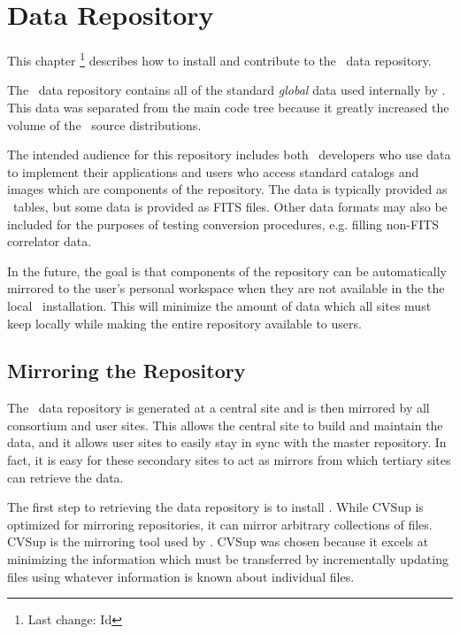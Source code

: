 \chapter{Data Repository}
\label{data repository}

This chapter \footnote{Last change:
$ $Id$ $}
describes how to install and contribute to the \aipspp\ data repository.

The \aipspp\ data repository contains all of the standard \textit{global}
data used internally by \aipspp. This data was separated from the main code tree
because it greatly increased the volume of the \aipspp\ source distributions.

The intended audience for this repository includes both \aipspp\ developers
who use data to implement their applications and users who access standard
catalogs and images which are components of the repository. The data is
typically provided as \aipspp\ tables, but some data is provided as FITS
files. Other data formats may also be included for the purposes of testing
conversion procedures, e.g. filling non-FITS correlator data.

In the future, the goal is that components of the repository can be
automatically mirrored to the user's personal workspace when they are not
available in the the local \aipspp\ installation. This will minimize the
amount of data which all sites must keep locally while making the entire
repository available to users.


\section{Mirroring the Repository}
\label{data repository mirroring}

The \aipspp\ data repository is generated at a central site and is then
mirrored by all consortium and user sites. This allows the central site
to build and maintain the data, and it allows user sites to easily stay
in sync with the master repository. In fact, it is easy for these secondary
sites to act as mirrors from which tertiary sites can retrieve the data.

The first step to retrieving the data repository is to install
. While
CVSup is optimized for mirroring 
repositories, it can mirror arbitrary collections of files. CVSup is the mirroring
tool used by . CVSup
was chosen because it excels at minimizing the information which must be
transferred by incrementally updating files using whatever information is
known about individual files.

